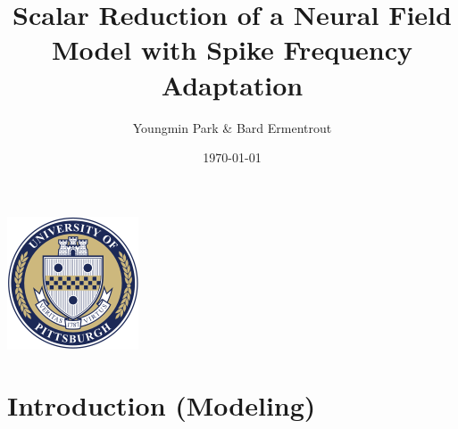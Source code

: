 \documentclass{beamer}
\title[Scalar Reduction of a Neural Field]{Scalar Reduction of a Neural Field Model with Spike Frequency Adaptation} %
\author[Y. Park \& G.B. Ermentrout]{Youngmin Park \& Bard Ermentrout} %
\institute[U Pitt]%
{
University of Pittsburgh Department of Mathematics\\ %
\medskip
\textit{yop6@pitt.edu} %
}
\date{\today} %
\begin{document}
\begin{frame}
\centering
\includegraphics[width=.2\textwidth]{pitt.png}
\titlepage %
\end{frame}
% 


\begin{frame}
 \tableofcontents
\end{frame}



\section{Introduction (Modeling)}
\end{document}
